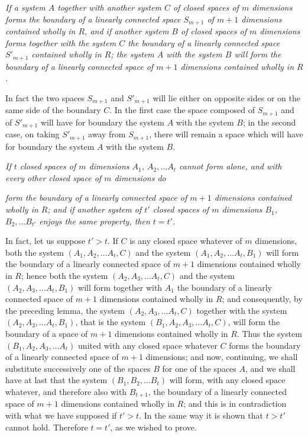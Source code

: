 \documentclass{article}
\begin{document}
\emph{If a system $A$ together with another system $C$ of closed spaces of $m$ dimensions forms the boundary of a linearly connected space $S_{m+1}$ of $m+1$ dimensions contained wholly in $R$, and if another system $B$ of closed spaces of $m$ dimensions forms together with the system $C$ the boundary of a linearly connected space $S'_{m+1}$ contained wholly in $R$; the system $A$ with the system $B$ will form the boundary of a linearly connected space of $m+1$ dimensions contained wholly in $R$.}

In fact the two spaces $S_{m+1}$ and $S'_{m+1}$ will lie either on opposite sides or on the same side of the boundary $C$. In the first case the space composed of $S_{m+1}$ and of $S'_{m+1}$ will have for boundary the system $A$ with the system $B$; in the second case, on taking $S'_{m+1}$ away from $S_{m+1}$, there will remain a space which will have for boundary the system $A$ with the system $B$.

\emph{If $t$ closed spaces of $m$ dimensions $A_{1}$, $A_{2},\ldots A_{t}$ cannot form alone, and with every other closed space of $m$ dimensions do}

\emph{form the boundary of a linearly connected space of $m+1$ dimensions contained wholly in $R$; and if another system of $t'$ closed spaces of $m$ dimensions $B_{1}$, $B_{2},\ldots B_{t'}$ enjoys the same property, then $t = t'$.}

In fact, let us suppose $t' > t$. If $C$ is any closed space whatever of $m$ dimensions, both the system $(A_{1}, A_{2},\ldots A_{t}, C)$ and the system $(A_{1}, A_{2},\ldots A_{t}, B_{1})$ will form the boundary of a linearly connected space of $m+1$ dimensions contained wholly in $R$; hence both the system $(A_{2}, A_{3},\ldots A_{t}, C)$ and the system $(A_{2}, A_{3},\ldots A_{t}, B_{1})$ will form together with $A_{1}$ the boundary of a linearly connected space of $m+1$ dimensions contained wholly in $R$; and consequently, by the preceding lemma, the system $(A_{2}, A_{3},\ldots A_{t}, C)$ together with the system $(A_{2}, A_{3},\ldots A_{t}, B_{1})$, that is the system $(B_{1}, A_{2}, A_{3},\ldots A_{t}, C)$, will form the boundary of a space of $m+1$ dimensions contained wholly in $R$. Thus the system $(B_{1}, A_{2}, A_{3},\ldots A_{t})$ united with any closed space whatever $C$ forms the boundary of a linearly connected space of $m+1$ dimensions; and now, continuing, we shall substitute successively one of the spaces $B$ for one of the spaces $A$, and we shall have at last that the system $(B_{1}, B_{2},\ldots B_{t})$ will form, with any closed space whatever, and therefore also with $B_{t+1}$, the boundary of a linearly connected space of $m+1$ dimensions contained wholly in $R$; and this is in contradiction with what we have supposed if $t' > t$. In the same way it is shown that $t > t'$ cannot hold. Therefore $t = t'$, as we wished to prove.
\end{document}
